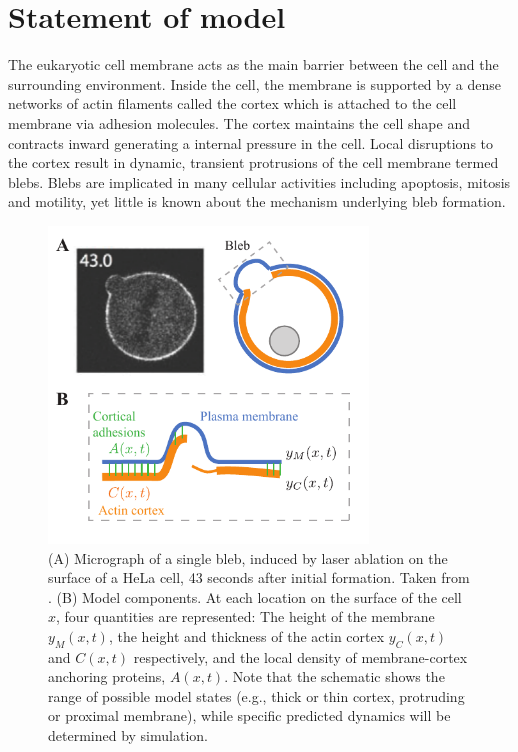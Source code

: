\section{Statement of model}
The eukaryotic cell membrane acts as the main barrier between the cell and the surrounding environment. Inside the cell, the membrane is supported by a dense networks of actin filaments called the cortex which is attached to the cell membrane via adhesion molecules. The cortex maintains the cell shape and contracts inward generating a internal pressure in the cell. Local disruptions to the cortex result in dynamic, transient protrusions of the cell membrane termed blebs. Blebs are implicated in many cellular activities including apoptosis, mitosis and motility, yet little is known about the mechanism underlying bleb formation.

\begin{figure}
   \begin{center}
	\includegraphics[width=8.5cm]{figs/figSchematic.pdf}
      \caption{(A) Micrograph of a single bleb, induced by laser ablation on the surface of a HeLa cell, 43 seconds after initial formation. Taken from \cite{Biro:2013bk}. (B) Model components. At each location on the surface of the cell $x$, four quantities are represented: The height of the membrane $y_M(x,t)$, the height and thickness of the actin cortex $y_C(x,t)$ and $C(x,t)$ respectively, and the local density of membrane-cortex anchoring proteins, $A(x,t)$. Note that the schematic shows the range of possible model states (e.g., thick or thin cortex, protruding or proximal membrane), while specific predicted dynamics will be determined by simulation.}
      \label{fig::schematic}
   \end{center}
\end{figure}

